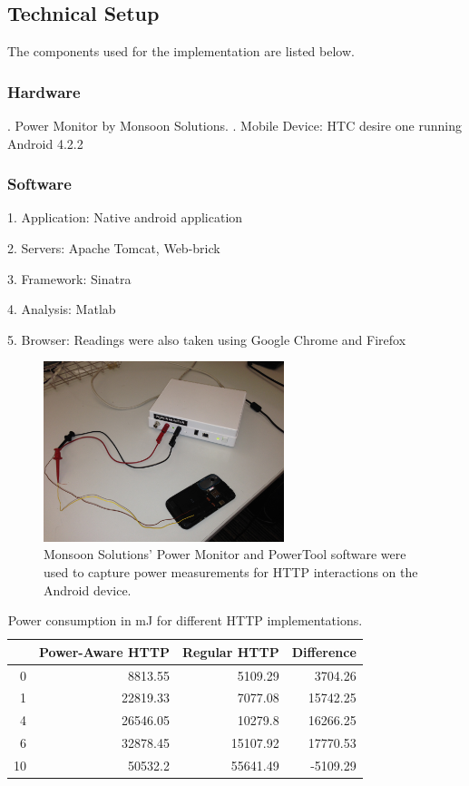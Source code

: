 \documentclass[9pt]{sigplan-proc-varsize}
\begin{document}
\subsection{Technical Setup}

The components used for the implementation are listed below.

\subsubsection{Hardware}

. Power Monitor by Monsoon Solutions. . Mobile Device: HTC desire one running Android 4.2.2

\subsubsection{Software}

1. Application: Native android application

2. Servers: Apache Tomcat, Web-brick

3. Framework: Sinatra

4. Analysis: Matlab

5. Browser: Readings were also taken using Google Chrome and Firefox

\begin{figure}[ht!]
\centering
\includegraphics[width=70mm]{monitor.jpg}
\caption{Monsoon Solutions’ Power Monitor and PowerTool software were used to capture power measurements for HTTP interactions on the Android device. }
\label{fig:sp_gd_mnist}
\end{figure}

\bigskip

\begin{table}[htbp]
\caption{Power consumption in mJ for different HTTP implementations.}
\begin{tabular}{|r|r|r|r|}
\hline
\multicolumn{1}{|l|}{} & \multicolumn{1}{l|}{Power-Aware HTTP} & \multicolumn{1}{l|}{Regular HTTP} & \multicolumn{1}{l|}{Difference} \\ \hline
0 & 8813.55 & 5109.29 & 3704.26 \\ \hline
1 & 22819.33 & 7077.08 & 15742.25 \\ \hline
4 & 26546.05 & 10279.8 & 16266.25 \\ \hline
6 & 32878.45 & 15107.92 & 17770.53 \\ \hline
10 & 50532.2 & 55641.49 & -5109.29 \\ \hline
\end{tabular}
\label{}
\end{table}
\end{document}
